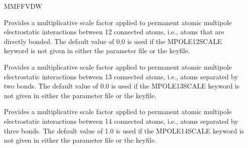 \documentclass[letterpaper,11pt,english]{sphinxmanual}
\begin{document}
\ignorespaces {}\label{\detokenize{text/keywords:key-mmffvdw}}
\sphinxAtStartPar
MMFFVDW

\ignorespaces {}\label{\detokenize{text/keywords:key-mpole-12-scale}}\begin{description}
\sphinxAtStartPar
Provides a multiplicative scale factor applied to permanent atomic multipole electrostatic interactions between 1\sphinxhyphen{}2 connected atoms, i.e., atoms that are directly bonded. The default value of 0.0 is used if the MPOLE\sphinxhyphen{}12\sphinxhyphen{}SCALE keyword is not given in either the parameter file or the keyfile.

\end{description}

\ignorespaces {}\label{\detokenize{text/keywords:key-mpole-13-scale}}\begin{description}
\sphinxAtStartPar
Provides a multiplicative scale factor applied to permanent atomic multipole  electrostatic interactions between 1\sphinxhyphen{}3 connected atoms, i.e., atoms separated by two bonds. The default value of 0.0 is used if the MPOLE\sphinxhyphen{}13\sphinxhyphen{}SCALE keyword is not given in either the parameter file or the keyfile.

\end{description}

\ignorespaces {}\label{\detokenize{text/keywords:key-mpole-14-scale}}\begin{description}
\sphinxAtStartPar
Provides a multiplicative scale factor applied to permanent atomic multipole  electrostatic interactions between 1\sphinxhyphen{}4 connected atoms, i.e., atoms separated by three bonds. The default value of 1.0 is used if the MPOLE\sphinxhyphen{}14\sphinxhyphen{}SCALE keyword is not given in either the parameter file or the keyfile.

\end{description}
\end{document}
